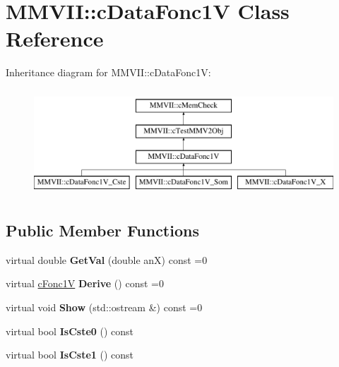 \hypertarget{classMMVII_1_1cDataFonc1V}{}\section{M\+M\+V\+II\+:\+:c\+Data\+Fonc1V Class Reference}
\label{classMMVII_1_1cDataFonc1V}
Inheritance diagram for M\+M\+V\+II\+:\+:c\+Data\+Fonc1V\+:\begin{figure}[H]
\begin{center}
\leavevmode
\includegraphics[height=4.000000cm]{classMMVII_1_1cDataFonc1V}
\end{center}
\end{figure}
\subsection*{Public Member Functions}
\begin{DoxyCompactItemize}
\item 
virtual double {\bfseries Get\+Val} (double anX) const =0\hypertarget{classMMVII_1_1cDataFonc1V_acda1c9d9464da19b606bf295589bd33e}{}\label{classMMVII_1_1cDataFonc1V_acda1c9d9464da19b606bf295589bd33e}

\item 
virtual \hyperlink{classMMVII_1_1cFonc1V}{c\+Fonc1V} {\bfseries Derive} () const =0\hypertarget{classMMVII_1_1cDataFonc1V_aa76cf2f3b8f0ae07f1a16f5baf4120a0}{}\label{classMMVII_1_1cDataFonc1V_aa76cf2f3b8f0ae07f1a16f5baf4120a0}

\item 
virtual void {\bfseries Show} (std\+::ostream \&) const =0\hypertarget{classMMVII_1_1cDataFonc1V_a44958a118377819e675533fc7f0782e1}{}\label{classMMVII_1_1cDataFonc1V_a44958a118377819e675533fc7f0782e1}

\item 
virtual bool {\bfseries Is\+Cste0} () const \hypertarget{classMMVII_1_1cDataFonc1V_a0e241702e072d3f5e486239d6468174b}{}\label{classMMVII_1_1cDataFonc1V_a0e241702e072d3f5e486239d6468174b}

\item 
virtual bool {\bfseries Is\+Cste1} () const \hypertarget{classMMVII_1_1cDataFonc1V_a7504a03ad6b182d8d0481eee6e3a756f}{}\label{classMMVII_1_1cDataFonc1V_a7504a03ad6b182d8d0481eee6e3a756f}

\end{DoxyCompactItemize}
